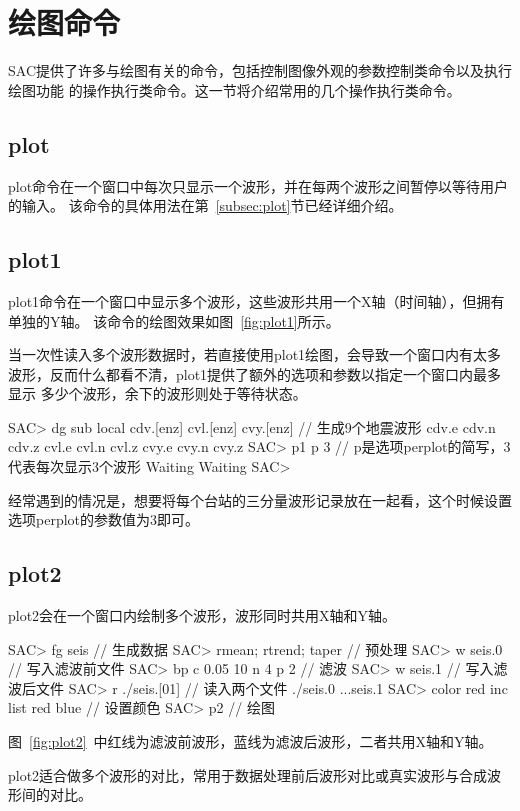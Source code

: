 \section{绘图命令}
SAC提供了许多与绘图有关的命令，包括控制图像外观的参数控制类命令以及执行绘图功能
的操作执行类命令。这一节将介绍常用的几个操作执行类命令。

\subsection{plot}
plot命令在一个窗口中每次只显示一个波形，并在每两个波形之间暂停以等待用户的输入。
该命令的具体用法在第~\ref{subsec:plot}节已经详细介绍。

\subsection{plot1}
plot1命令在一个窗口中显示多个波形，这些波形共用一个X轴（时间轴），但拥有单独的Y轴。
该命令的绘图效果如图~\ref{fig:plot1}所示。

当一次性读入多个波形数据时，若直接使用plot1绘图，会导致一个窗口内有太多
波形，反而什么都看不清，plot1提供了额外的选项和参数以指定一个窗口内最多显示
多少个波形，余下的波形则处于等待状态。
\begin{SACCode}
SAC> dg sub local cdv.[enz] cvl.[enz] cvy.[enz]  // 生成9个地震波形
cdv.e cdv.n cdv.z cvl.e cvl.n cvl.z cvy.e cvy.n cvy.z
SAC> p1 p 3         // p是选项perplot的简写，3代表每次显示3个波形
Waiting
Waiting
SAC> 
\end{SACCode}
经常遇到的情况是，想要将每个台站的三分量波形记录放在一起看，这个时候设置选项perplot的参数值为3即可。

\subsection{plot2}
plot2会在一个窗口内绘制多个波形，波形同时共用X轴和Y轴。

\begin{SACCode}
SAC> fg seis                     // 生成数据
SAC> rmean; rtrend; taper        // 预处理
SAC> w seis.0                    // 写入滤波前文件
SAC> bp c 0.05 10 n 4 p 2        // 滤波
SAC> w seis.1                    // 写入滤波后文件
SAC> r ./seis.[01]               // 读入两个文件
./seis.0 ...seis.1
SAC> color red inc list red blue // 设置颜色
SAC> p2                          // 绘图
\end{SACCode}
图~\ref{fig:plot2}~中红线为滤波前波形，蓝线为滤波后波形，二者共用X轴和Y轴。

plot2适合做多个波形的对比，常用于数据处理前后波形对比或真实波形与合成波形间的对比。

